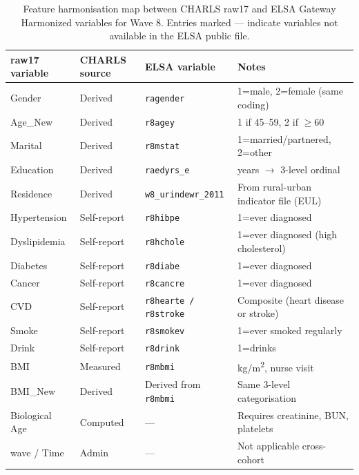 \documentclass[11pt,a4paper]{article}
\begin{document}
\begin{table}[h!]
\centering
\small
\caption{Feature harmonisation map between CHARLS raw17 and ELSA Gateway Harmonized variables
for Wave 8. Entries marked --- indicate variables not available in the ELSA public file.}
\label{tab:elsa-harmonisation}
\begin{tabular}{lllp{5.5cm}}
\toprule
raw17 variable & CHARLS source & ELSA variable & Notes \\
\midrule
Gender & Derived & \texttt{ragender} & 1=male, 2=female (same coding) \\
Age\_New & Derived & \texttt{r8agey} & 1 if 45--59, 2 if $\geq 60$ \\
Marital & Derived & \texttt{r8mstat} & 1=married/partnered, 2=other \\
Education & Derived & \texttt{raedyrs\_e} & years $\rightarrow$ 3-level ordinal \\
Residence & Derived & \texttt{w8\_urindewr\_2011} & From rural-urban indicator file (EUL) \\
Hypertension & Self-report & \texttt{r8hibpe} & 1=ever diagnosed \\
Dyslipidemia & Self-report & \texttt{r8hchole} & 1=ever diagnosed (high cholesterol) \\
Diabetes & Self-report & \texttt{r8diabe} & 1=ever diagnosed \\
Cancer & Self-report & \texttt{r8cancre} & 1=ever diagnosed \\
CVD & Self-report & \texttt{r8hearte / r8stroke} & Composite (heart disease or stroke) \\
Smoke & Self-report & \texttt{r8smokev} & 1=ever smoked regularly \\
Drink & Self-report & \texttt{r8drink} & 1=drinks \\
BMI & Measured & \texttt{r8mbmi} & kg/m\textsuperscript{2}, nurse visit \\
BMI\_New & Derived & Derived from \texttt{r8mbmi} & Same 3-level categorisation \\
Biological Age & Computed & --- & Requires creatinine, BUN, platelets \\
wave / Time & Admin & --- & Not applicable cross-cohort \\
\bottomrule
\end{tabular}
\end{table}
\end{document}
